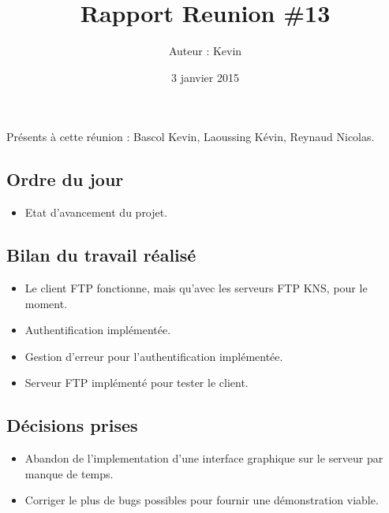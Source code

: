 \documentclass[12pt,a4paper]{article}
\title{Rapport Reunion \#13}
\author{Auteur : Kevin \bsc{BASCOL}}
\date{3 janvier 2015}
\begin{document}
\maketitle

\newpage

Présents à cette réunion : Bascol Kevin, Laoussing Kévin, Reynaud Nicolas.

\subsection*{Ordre du jour}
\begin{itemize}[label = $\blacktriangleright$]
\item Etat d'avancement du projet.
\end{itemize}

\subsection*{Bilan du travail réalisé}

\begin{itemize}[label = $\blacktriangleright$]
\item Le client FTP fonctionne, mais qu'avec les serveurs FTP KNS, pour le moment.

\item Authentification implémentée. 

\item Gestion d'erreur pour l'authentification implémentée.

\item Serveur FTP implémenté pour tester le client.
\end{itemize}


\subsection*{Décisions prises}

\begin{itemize}[label = $\blacktriangleright$] 
\item Abandon de l'implementation d'une interface graphique sur le serveur par manque de temps.

\item Corriger le plus de bugs possibles pour fournir une démonstration viable.
\end{itemize}
\end{document}
